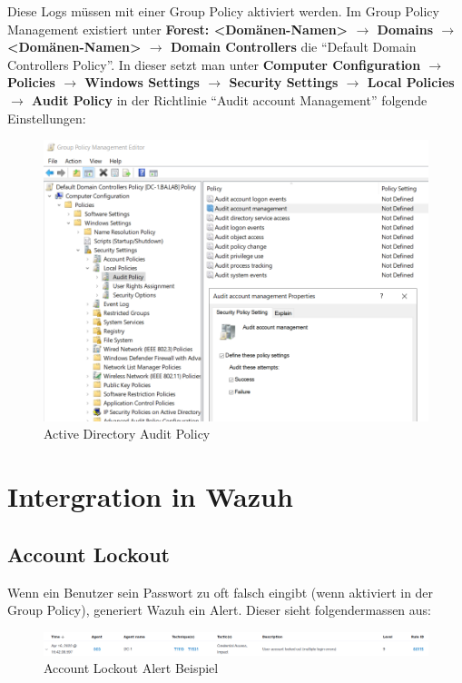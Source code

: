 Diese Logs müssen mit einer Group Policy aktiviert werden.
Im Group Policy Management existiert unter \textbf{Forest: <Domänen-Namen> $\rightarrow$ Domains $\rightarrow$ <Domänen-Namen> $\rightarrow$ Domain Controllers} die ``Default Domain Controllers Policy''.
In dieser setzt man unter \textbf{Computer Configuration $\rightarrow$ Policies $\rightarrow$ Windows Settings $\rightarrow$ Security Settings $\rightarrow$ Local Policies $\rightarrow$ Audit Policy} in der Richtlinie ``Audit account Management'' folgende Einstellungen:\\
\begin{figure}[H]
    \centering
    \includegraphics[width=\linewidth]{../img/IAM/ad-account-management.png}
    \caption{Active Directory Audit Policy}
\end{figure}

\section{Intergration in Wazuh}
\subsection{Account Lockout}
Wenn ein Benutzer sein Passwort zu oft falsch eingibt (wenn aktiviert in der Group Policy), generiert Wazuh ein Alert.
Dieser sieht folgendermassen aus:
\begin{figure}[H]
    \centering
    \includegraphics[width=\linewidth]{../img/IAM/account-lockout.png}
    \caption{Account Lockout Alert Beispiel}
\end{figure}

